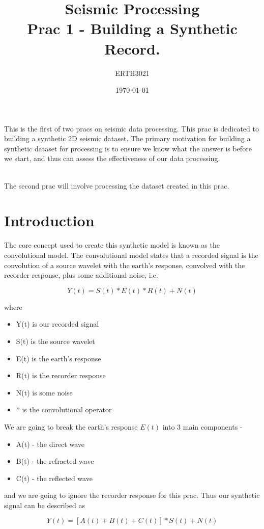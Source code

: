 \documentclass[a4paper, 10pt]{article}
\title{Seismic Processing \\ Prac 1 - Building a Synthetic Record.} %
\author{ERTH3021} %
\date{\today} %
\begin{document}
\maketitle %
This is the first of two pracs on seismic data processing.  This prac is dedicated to building a synthetic 2D seismic dataset. The primary motivation for building a synthetic dataset for processing is to ensure we know what the answer is before we start, and thus can assess the effectiveness of our data processing.  
\par~\\
The second prac will involve processing the dataset created in this prac.
\section{Introduction}

The core concept used to create this synthetic model is known as the convolutional model. The convolutional model states that a recorded signal is the convolution of a source wavelet with the earth's response, convolved with the recorder response, plus some additional noise, i.e.

\[Y(t) =  S(t) * E(t) * R(t) + N(t)\]

where
\begin{itemize}
\item Y(t) is our recorded signal
\item S(t) is the source wavelet
\item E(t) is the earth's response
\item R(t) is the recorder response
\item N(t) is some noise
\item * is the convolutional operator
\end{itemize}

We are going to break the earth's response $E(t)$ into 3 main components - 
\begin{itemize}
\item A(t) - the direct wave
\item B(t) - the refracted wave
\item C(t) - the reflected wave
\end{itemize}

and we are going to ignore the recorder response for this prac.  Thus our synthetic signal can be described as 

\[ Y(t) = \left[ A(t) + B(t) + C(t) \right] * S(t) + N(t) \]
\end{document}
